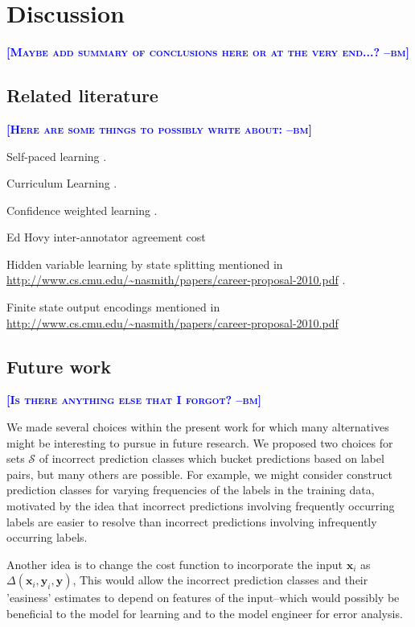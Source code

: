 \documentclass{article} %
\newcommand{\bmcomment}[1]{\textcolor{blue}{\textsc{\textbf{[#1 --bm]}}}}
\begin{document}
\section{Discussion}

\bmcomment{Maybe add summary of conclusions here or at the 
very end...?}

\subsection{Related literature}

\bmcomment{Here are some things to possibly write about:}

Self-paced learning \citep{kumar2010self}.

Curriculum Learning \citep{bengio2009curriculum}.

Confidence weighted learning \citep{dredze2008confidence}.

Ed Hovy inter-annotator agreement cost \citep{plank2014learning}

Hidden variable learning by state splitting mentioned in 
\url{http://www.cs.cmu.edu/~nasmith/papers/career-proposal-2010.pdf} 
\citep{petrov2011coarse}.

Finite state output encodings mentioned in 
\url{http://www.cs.cmu.edu/~nasmith/papers/career-proposal-2010.pdf}
\citep{loper2008encoding}

\subsection{Future work}

\bmcomment{Is there anything else that I forgot?}

We made several choices within the present work for which
many alternatives might be interesting to pursue in
future research.  We proposed two choices for 
sets $\mathcal{S}$ of incorrect prediction classes which 
bucket predictions based on label pairs, but many others
are possible. For example, we might consider construct
prediction classes for varying frequencies of the labels
in the training data, motivated by the idea that incorrect
predictions involving frequently occurring labels are easier
to resolve than incorrect predictions involving infrequently
occurring labels.  

Another idea is to change the cost function
to incorporate the input $\mathbf{x}_i$ as 
$\Delta(\mathbf{x}_i,\mathbf{y}_i,\mathbf{y})$, This would
allow the incorrect prediction classes and their 'easiness' 
estimates to depend on features of the input--which would
possibly be beneficial to the model for learning and to 
the model engineer for error analysis.
\end{document}
